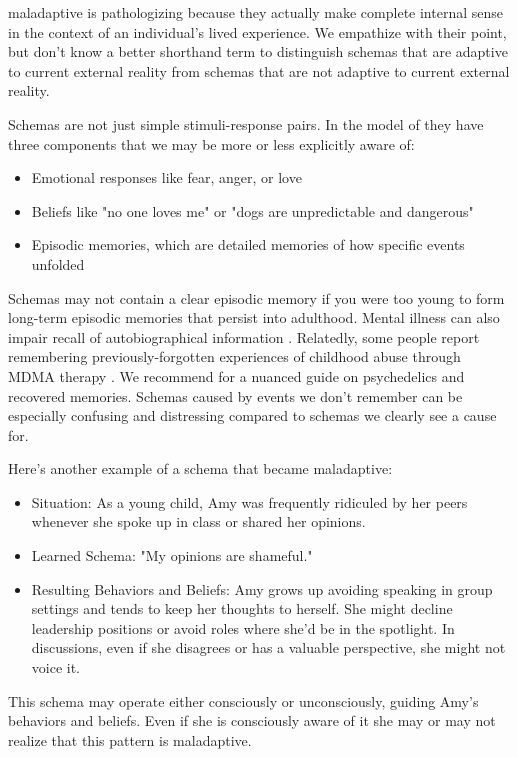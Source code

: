 \documentclass[12pt,letterpaper]{book}
\begin{document}
maladaptive is pathologizing because they actually make complete internal sense in the context of an individual's lived experience. We empathize with their point, but don't know a better shorthand term to distinguish schemas that are adaptive to current external reality from schemas that are not adaptive to current external reality.

Schemas are not just simple stimuli-response pairs. In the model of \textcite{laneReconsolidation} they have three components that we may be more or less explicitly aware of:
\begin{itemize}
	\item Emotional responses like fear, anger, or love
	\item Beliefs like "no one loves me" or "dogs are unpredictable and dangerous"
	\item Episodic memories, which are detailed memories of how specific events unfolded
\end{itemize}
Schemas may not contain a clear episodic memory if you were too young to form long-term episodic memories that persist into adulthood. Mental illness can also impair recall of autobiographical information \cite{berghSelfEvidencing}. Relatedly, some people report remembering previously-forgotten experiences of childhood abuse through MDMA therapy \cite{psychedelicrecoveredmemory}. We recommend \textcite{psychedelicrecoveredmemory} for a nuanced guide on psychedelics and recovered memories. Schemas caused by events we don't remember can be especially confusing and distressing compared to schemas we clearly see a cause for.

Here's another example of a schema that became maladaptive:
\begin{itemize}
    \item Situation: As a young child, Amy was frequently ridiculed by her peers whenever she spoke up in class or shared her opinions.
    \item Learned Schema: "My opinions are shameful."
    \item Resulting Behaviors and Beliefs: Amy grows up avoiding speaking in group settings and tends to keep her thoughts to herself. She might decline leadership positions or avoid roles where she'd be in the spotlight. In discussions, even if she disagrees or has a valuable perspective, she might not voice it.
\end{itemize}
This schema may operate either consciously or unconsciously, guiding Amy's behaviors and beliefs. Even if she is consciously aware of it she may or may not realize that this pattern is maladaptive.
\end{document}
